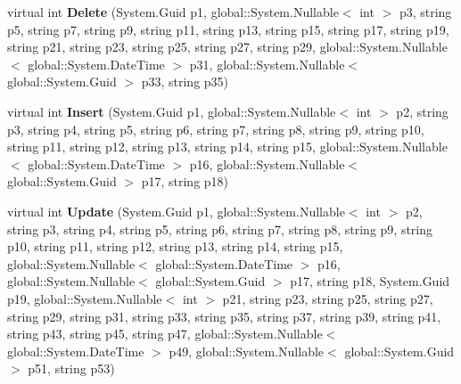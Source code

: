 \begin{DoxyCompactItemize}
\item 
virtual int {\bfseries Delete} (System.\+Guid p1, global\+::\+System.\+Nullable$<$ int $>$ p3, string p5, string p7, string p9, string p11, string p13, string p15, string p17, string p19, string p21, string p23, string p25, string p27, string p29, global\+::\+System.\+Nullable$<$ global\+::\+System.\+Date\+Time $>$ p31, global\+::\+System.\+Nullable$<$ global\+::\+System.\+Guid $>$ p33, string p35)\hypertarget{class_products_1_1_data_1_1ds_sage_table_adapters_1_1ta_interessent_af41730a1e122c50adcc1ee1d16528588}{}\label{class_products_1_1_data_1_1ds_sage_table_adapters_1_1ta_interessent_af41730a1e122c50adcc1ee1d16528588}

\item 
virtual int {\bfseries Insert} (System.\+Guid p1, global\+::\+System.\+Nullable$<$ int $>$ p2, string p3, string p4, string p5, string p6, string p7, string p8, string p9, string p10, string p11, string p12, string p13, string p14, string p15, global\+::\+System.\+Nullable$<$ global\+::\+System.\+Date\+Time $>$ p16, global\+::\+System.\+Nullable$<$ global\+::\+System.\+Guid $>$ p17, string p18)\hypertarget{class_products_1_1_data_1_1ds_sage_table_adapters_1_1ta_interessent_a9de380b069f2b0864a7d81756f5101e0}{}\label{class_products_1_1_data_1_1ds_sage_table_adapters_1_1ta_interessent_a9de380b069f2b0864a7d81756f5101e0}

\item 
virtual int {\bfseries Update} (System.\+Guid p1, global\+::\+System.\+Nullable$<$ int $>$ p2, string p3, string p4, string p5, string p6, string p7, string p8, string p9, string p10, string p11, string p12, string p13, string p14, string p15, global\+::\+System.\+Nullable$<$ global\+::\+System.\+Date\+Time $>$ p16, global\+::\+System.\+Nullable$<$ global\+::\+System.\+Guid $>$ p17, string p18, System.\+Guid p19, global\+::\+System.\+Nullable$<$ int $>$ p21, string p23, string p25, string p27, string p29, string p31, string p33, string p35, string p37, string p39, string p41, string p43, string p45, string p47, global\+::\+System.\+Nullable$<$ global\+::\+System.\+Date\+Time $>$ p49, global\+::\+System.\+Nullable$<$ global\+::\+System.\+Guid $>$ p51, string p53)\hypertarget{class_products_1_1_data_1_1ds_sage_table_adapters_1_1ta_interessent_aeb8f0a61f55d4a231d14eb57f02a2032}{}\label{class_products_1_1_data_1_1ds_sage_table_adapters_1_1ta_interessent_aeb8f0a61f55d4a231d14eb57f02a2032}


\end{DoxyCompactItemize}
